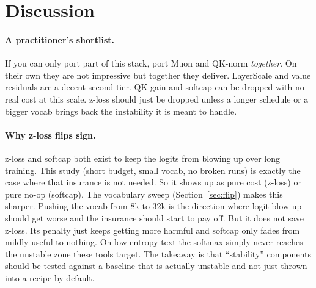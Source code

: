 \documentclass[11pt]{article}
\begin{document}
\section{Discussion}

\paragraph{A practitioner's shortlist.} If you can only port part of this stack,
port Muon and QK-norm \emph{together}. On their own they are not impressive but
together they deliver. LayerScale and value residuals are a decent second tier.
QK-gain and softcap can be dropped with no real cost at this scale. z-loss should
just be dropped unless a longer schedule or a bigger vocab brings back the
instability it is meant to handle.

\paragraph{Why z-loss flips sign.} z-loss and softcap both exist to keep the logits
from blowing up over long training. This study (short budget, small vocab, no
broken runs) is exactly the case where that insurance is not needed. So it shows up
as pure cost (z-loss) or pure no-op (softcap). The vocabulary sweep
(Section~\ref{sec:flip}) makes this sharper. Pushing the vocab from 8k to 32k is the
direction where logit blow-up should get worse and the insurance should start to
pay off. But it does not save z-loss. Its penalty just keeps getting more harmful
and softcap only fades from mildly useful to nothing. On low-entropy text the
softmax simply never reaches the unstable zone these tools target. The takeaway is
that ``stability'' components should be tested against a baseline that is actually
unstable and not just thrown into a recipe by default.
\end{document}
